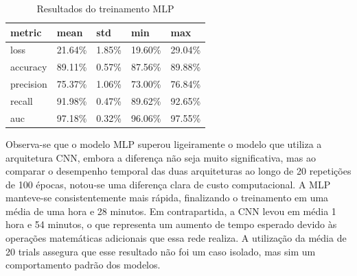 \begin{table}[H]
    \centering
    \caption{Resultados do treinamento MLP}
    \label{tab:train_mlp}
    \begin{tabular}{@{}lllll@{}}
        \toprule
        \textbf{metric} & \textbf{mean} & \textbf{std} & \textbf{min} & \textbf{max} \\
        \midrule
        loss & 21.64\% & 1.85\% & 19.60\% & 29.04\% \\
        accuracy & 89.11\% & 0.57\% & 87.56\% & 89.88\% \\
        precision & 75.37\% & 1.06\% & 73.00\% & 76.84\% \\
        recall & 91.98\% & 0.47\% & 89.62\% & 92.65\% \\
        auc & 97.18\% & 0.32\% & 96.06\% & 97.55\% \\
        \bottomrule
    \end{tabular}
\end{table}

Observa-se que o modelo MLP superou ligeiramente o modelo que utiliza a arquitetura CNN, embora a diferença não seja muito significativa, mas ao comparar o desempenho temporal das duas arquiteturas ao longo de 20 repetições de 100 épocas, notou-se uma diferença clara de custo computacional. A MLP manteve-se consistentemente mais rápida, finalizando o treinamento em uma média de uma hora e 28 minutos. Em contrapartida, a CNN levou em média 1 hora e 54 minutos, o que representa um aumento de tempo esperado devido às operações matemáticas adicionais que essa rede realiza. A utilização da média de 20 trials assegura que esse resultado não foi um caso isolado, mas sim um comportamento padrão dos modelos.
